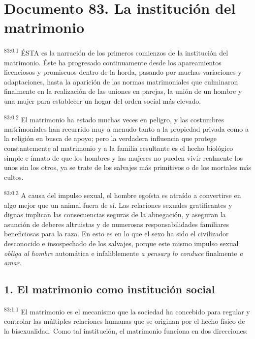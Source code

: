 \chapter{Documento 83. La institución del matrimonio}
\par
\textsuperscript{83:0.1} ÉSTA es la narración de los primeros comienzos de la institución del matrimonio. Éste ha progresado continuamente desde los apareamientos licenciosos y promiscuos dentro de la horda, pasando por muchas variaciones y adaptaciones, hasta la aparición de las normas matrimoniales que culminaron finalmente en la realización de las uniones en parejas, la unión de un hombre y una mujer para establecer un hogar del orden social más elevado.

\par
\textsuperscript{83:0.2} El matrimonio ha estado muchas veces en peligro, y las costumbres matrimoniales han recurrido muy a menudo tanto a la propiedad privada como a la religión en busca de apoyo; pero la verdadera influencia que protege constantemente al matrimonio y a la familia resultante es el hecho biológico simple e innato de que los hombres y las mujeres no pueden vivir realmente los unos sin los otros, ya se trate de los salvajes más primitivos o de los mortales más cultos.

\par
\textsuperscript{83:0.3} A causa del impulso sexual, el hombre egoísta es atraído a convertirse en algo mejor que un animal fuera de sí. Las relaciones sexuales gratificantes y dignas implican las consecuencias seguras de la abnegación, y aseguran la asunción de deberes altruistas y de numerosas responsabilidades familiares beneficiosas para la raza. En esto es en lo que el sexo ha sido el civilizador desconocido e insospechado de los salvajes, porque este mismo impulso sexual \textit{obliga al hombre} automática e infaliblemente \textit{a pensary lo conduce} finalmente \textit{a amar}.

\section*{1. El matrimonio como institución social}
\par
\textsuperscript{83:1.1} El matrimonio es el mecanismo que la sociedad ha concebido para regular y controlar las múltiples relaciones humanas que se originan por el hecho físico de la bisexualidad. Como tal institución, el matrimonio funciona en dos direcciones:

